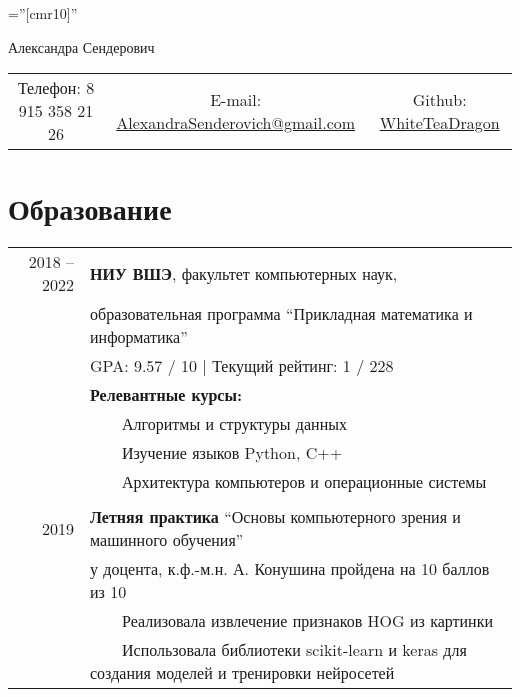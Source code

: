 \documentclass[a4paper,10pt]{article}
\newcommand{\tabitem}{~~\llap{\textbullet}~~}
\begin{document}

\pagestyle{empty} %

\font\fb=''[cmr10]'' %

\par{\centering
		{\Huge Александра Сендерович
	}\bigskip\par}


\begin{center}
\begin{tabular}{c c c}
     Телефон: 8 915 358 21 26 & E-mail: \href{mailto:alexandrasenderovich@gmail.com}{AlexandraSenderovich@gmail.com} & Github: \href{https://github.com/WhiteTeaDragon}{WhiteTeaDragon}
\end{tabular}
\end{center}

\section{Образование}
\begin{tabular}{rl}	
2018 -- 2022 & \textbf{НИУ ВШЭ}, факультет компьютерных наук, \\ & образовательная программа ``Прикладная математика и информатика''\\
& GPA: 9.57 / 10 | Текущий рейтинг: 1 / 228 \\
& \textbf{Релевантные курсы:}\\
& \tabitem Алгоритмы и структуры данных \\
& \tabitem Изучение языков Python, C++ \\
& \tabitem Архитектура компьютеров и операционные системы \\
& \\
2019 & \textbf{Летняя практика} ``Основы компьютерного зрения и машинного обучения'' \\
& у доцента, к.ф.-м.н. А. Конушина пройдена на 10 баллов из 10 \\
& \tabitem Реализовала извлечение признаков HOG из картинки \\
& \tabitem Использовала библиотеки scikit-learn и keras для создания моделей и тренировки нейросетей 
\end{tabular}
\end{document}
